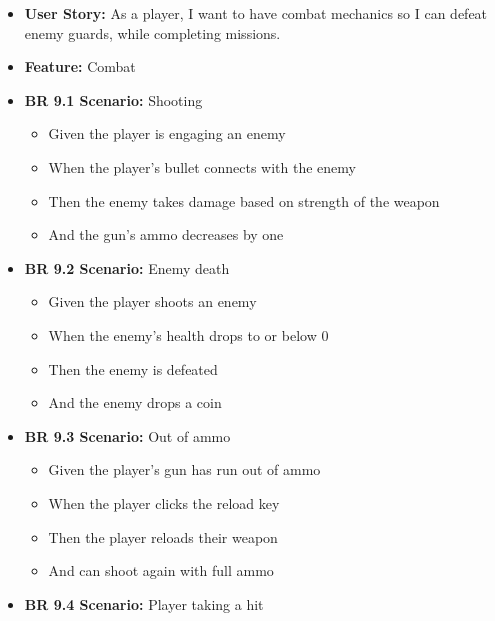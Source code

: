 \documentclass[11pt, a4paper]{article}
\begin{document}
\begin{itemize}
    \item \textbf{User Story:} As a player, I want to have combat mechanics so I can defeat enemy guards, while completing missions.

    \item \textbf{Feature:} Combat

    \item \textbf{BR 9.1 Scenario:} Shooting

          \begin{itemize}
              \item Given the player is engaging an enemy
              \item When the player’s bullet connects with the enemy
              \item Then the enemy takes damage based on strength of the weapon
              \item And the gun’s ammo decreases by one
          \end{itemize}

    \item \textbf{BR 9.2 Scenario:} Enemy death

          \begin{itemize}
              \item Given the player shoots an enemy
              \item When the enemy’s health drops to or below 0
              \item Then the enemy is defeated
              \item And the enemy drops a coin
          \end{itemize}

    \item \textbf{BR 9.3 Scenario:} Out of ammo

          \begin{itemize}
              \item Given the player’s gun has run out of ammo
              \item When the player clicks the reload key
              \item Then the player reloads their weapon
              \item And can shoot again with full ammo
          \end{itemize}

    \item \textbf{BR 9.4 Scenario:} Player taking a hit


\end{itemize}
\end{document}
